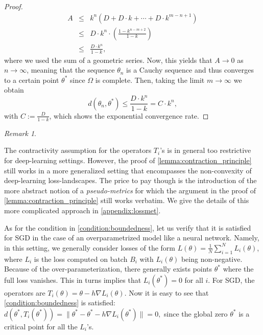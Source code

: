 \documentclass[10pt]{article} %
\theoremstyle{plain}
\theoremstyle{definition}
\theoremstyle{remark}
\newtheorem{remark}[theorem]{Remark}
\begin{document}
\begin{proof}
    \begin{eqnarray*}
        A  & \leq &  k^{n}\left(D+D\cdot k+\cdots + D\cdot k^{m-n+1}\right) \\
           & \leq & D\cdot k^n  \cdot \left( \frac{1 - k^{n-m+2}}{1-k}\right) \\
          & \leq & \frac{D\cdot k^{n}}{1-k},
    \end{eqnarray*}
    where we used the sum of a geometric series. Now, this yields that $A\rightarrow 0$ as $n\rightarrow\infty$, meaning that the sequence $\theta_n$
    is a Cauchy sequence and thus converges to a certain point $\theta^*$
    since $\Omega$ is complete. 
    Then, taking the limit $m\rightarrow \infty$ we obtain
    \[
    d(\theta_n,\theta^*) \leq \frac{D\cdot k^{n}}{1-k} = C\cdot k^n,
    \]
    with $C:=\frac{D}{1-k}$, which shows the exponential convergence rate.
\end{proof}

\begin{remark}
\label{remark:assumptions_and_generalization_for_deep_learning}

The contractivity assumption for the operators $T_i$'s is in general too restrictive for deep-learning settings. However, the proof of \cref{lemma:contraction_principle} still works in a more generalized setting that encompasses the non-convexity of deep-learning loss-landscapes. The price to pay though is the introduction of the more abstract notion of a \emph{pseudo-metrics} for which the argument in the proof of \cref{lemma:contraction_principle} still works verbatim. We give the details of this more complicated approach in \cref{appendix:lossmet}.

As for the condition in \cref{condition:boundedness}, let us verify that it is satisfied for SGD in the case of an overparametrized model like a neural network. Namely, in this setting, we generally consider losses of the form $L(\theta)= \frac {1}{N} \sum_{i=1}^N L_i(\theta)$, where $L_i$ is the loss computed on batch $B_i$ with $L_i(\theta)$ being non-negative. Because of the over-parameterization, there generally exists points $\theta^*$ where the full loss vanishes. This in turns implies that $L_i(\theta^*) = 0$ for all $i$. For SGD, the operators are $T_i(\theta) = \theta - h\nabla L_i(\theta)$. Now it is easy to see that \cref{condition:boundedness} is satisfied:
$
d(\theta^*, T_i(\theta^*)) = \|\theta^* - \theta^* - h\nabla L_i(\theta^*)\| = 0,
$
since the global zero $\theta^*$ is a critical point for all the $L_i$'s. 

\end{remark}
\end{document}
